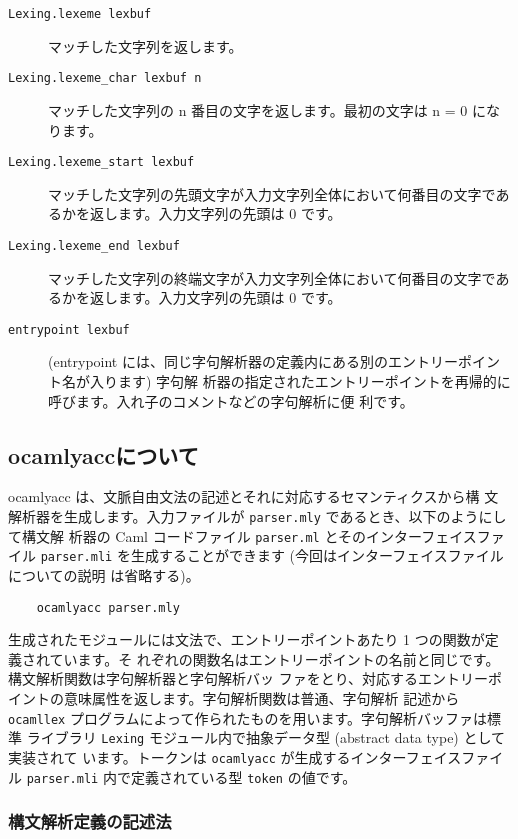 \documentclass[a4paper,11pt]{jsarticle}
\begin{document}
\begin{description}
\item [\texttt{Lexing.lexeme lexbuf}]
  マッチした文字列を返します。
\item [\texttt{Lexing.lexeme\_char lexbuf n}]
  マッチした文字列の n 番目の文字を返します。最初の文字は n = 0 になります。
\item [\texttt{Lexing.lexeme\_start lexbuf}]
  マッチした文字列の先頭文字が入力文字列全体において何番目の文字であるかを返します。入力文字列の先頭は 0 です。
\item [\texttt{Lexing.lexeme\_end lexbuf}]
  マッチした文字列の終端文字が入力文字列全体において何番目の文字であるかを返します。入力文字列の先頭は 0 です。
\item [\texttt{entrypoint lexbuf}]
  (entrypoint には、同じ字句解析器の定義内にある別のエントリーポイント名が入ります) 字句解
  析器の指定されたエントリーポイントを再帰的に呼びます。入れ子のコメントなどの字句解析に便
  利です。
\end{description}

\subsection{ocamlyaccについて}

ocamlyacc は、文脈自由文法の記述とそれに対応するセマンティクスから構
文解析器を生成します。入力ファイルが \verb|parser.mly|  であるとき、以下のようにして構文解
析器の Caml コードファイル \verb|parser.ml| とそのインターフェイスファイル
\verb|parser.mli|  を生成することができます (今回はインターフェイスファイルについての説明
は省略する)。

\begin{lstlisting}
    ocamlyacc parser.mly
\end{lstlisting}

生成されたモジュールには文法で、エントリーポイントあたり 1 つの関数が定義されています。そ
れぞれの関数名はエントリーポイントの名前と同じです。構文解析関数は字句解析器と字句解析バッ
ファをとり、対応するエントリーポイントの意味属性を返します。字句解析関数は普通、字句解析
記述から \verb|ocamllex| プログラムによって作られたものを用います。字句解析バッファは標準
ライブラリ \verb|Lexing| モジュール内で抽象データ型 (abstract data type) として実装されて
います。トークンは \verb|ocamlyacc| が生成するインターフェイスファイル \verb|parser.mli|
内で定義されている型 \verb|token| の値です。

\subsubsection{構文解析定義の記述法}
\end{document}
